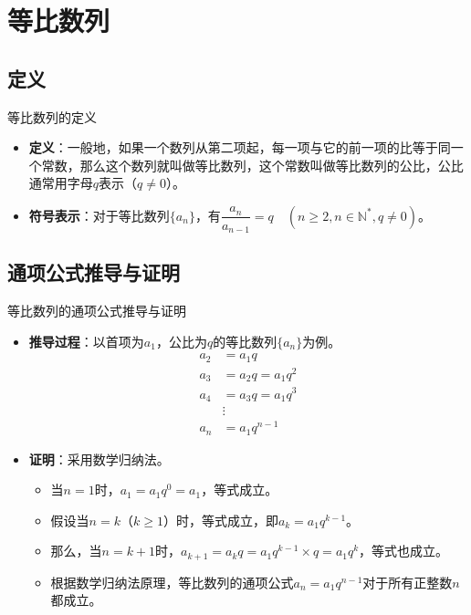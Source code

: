 \documentclass[aspectratio=169]{ctexbeamer} %
\begin{document}
\section{等比数列}
\subsection{定义}
\begin{frame}{等比数列的定义}
\begin{itemize}
\item \textbf{定义}：一般地，如果一个数列从第二项起，每一项与它的前一项的比等于同一个常数，那么这个数列就叫做等比数列，这个常数叫做等比数列的公比，公比通常用字母$q$表示（$q \neq 0$）。
\item \textbf{符号表示}：对于等比数列$\{a_n\}$，有$\dfrac{a_n}{a_{n-1}} = q\quad(n \geq 2, n \in \mathbb{N}^*, q \neq 0)$。
\end{itemize}
\end{frame}

\subsection{通项公式推导与证明}
\begin{frame}{等比数列的通项公式推导与证明}
\begin{itemize}
\item \textbf{推导过程}：以首项为$a_1$，公比为$q$的等比数列$\{a_n\}$为例。
\begin{align*}
a_2 &= a_1 q \\
a_3 &= a_2 q = a_1 q^2 \\
a_4 &= a_3 q = a_1 q^3 \\
&\vdots \\
a_n &= a_1 q^{n-1}
\end{align*}
\item \textbf{证明}：采用数学归纳法。
\begin{itemize}
\item 当$n = 1$时，$a_1 = a_1 q^0 = a_1$，等式成立。
\item 假设当$n = k$（$k \geq 1$）时，等式成立，即$a_k = a_1 q^{k-1}$。
\item 那么，当$n = k + 1$时，$a_{k+1} = a_k q = a_1 q^{k-1} \times q = a_1 q^k$，等式也成立。
\item 根据数学归纳法原理，等比数列的通项公式$a_n = a_1 q^{n-1}$对于所有正整数$n$都成立。
\end{itemize}
\end{itemize}
\end{frame}
\end{document}
